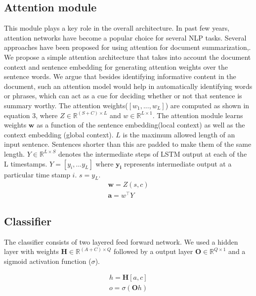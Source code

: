 \subsection{Attention module} This module plays a key role in the overall architecture. In past few years, attention networks have become a popular choice for several NLP tasks. Several approaches have been proposed for using attention for document summarization\cite{cheng2016neural},\cite{rush2015neural}. We propose a simple attention architecture that takes into account the document context and sentence embedding for generating attention weights over the sentence words. We argue that besides identifying informative content in the document, such an attention model would help in automatically identifying words or phrases, which can act as a cue for deciding whether or not that sentence is summary worthy. The attention weights($[w_1,...,w_L]$) are computed as shown in equation 3, where $Z \in \mathbb{R}^{(S+C)\times L}$ and $w \in \mathbb{R}^{L\times1}$. The attention module learns weights $\boldsymbol{w}$ as a function of the sentence embedding(local context) as well as the context embedding (global context). $L$ is the maximum allowed length of an input sentence. Sentences shorter than this are padded to make them of the same length. $Y \in \mathbb{R}^{L\times S}$ denotes the intermediate steps of LSTM output at each of the L timestamps. $Y = [y_i,...y_L]$ where $\boldsymbol{y_i}$ represents intermediate output at a particular time stamp $i$. $s = y_L$.
\vspace{-1mm}
\begin{eqnarray}
\boldsymbol{w} = Z(s,c)\\
\label{eq2}
\boldsymbol{a} = w^\intercal Y
\end{eqnarray}
\vspace{-5mm}
\subsection{Classifier} The classifier consists of two layered feed forward network. We used a hidden layer with weights $\boldsymbol{H} \in \mathbb{R}^{(A+C) \times Q}$ followed by a output layer $\boldsymbol{O} \in \mathbb{R}^{Q \times 1}$ and a sigmoid activation function ($\sigma$). 

\begin{eqnarray}
h = \boldsymbol{H}[a,c]\\
o = \sigma(\boldsymbol{O}h)
\end{eqnarray}

